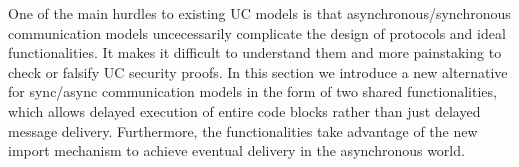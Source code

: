 One of the main hurdles to existing UC models is that asynchronous/synchronous communication models uncecessarily complicate the design of protocols and ideal functionalities.
It makes it difficult to understand them and more painstaking to check or falsify UC security proofs. 
In this section we introduce a new alternative for sync/async communication models in the form of two shared functionalities, which allows delayed execution of entire code blocks rather than just delayed message delivery.
Furthermore, the functionalities take advantage of the new import mechanism to achieve eventual delivery in the asynchronous world.


